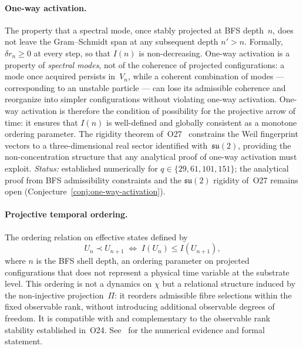   \paragraph{One-way activation.}
    The property that a spectral mode, once stably projected at BFS depth~$n$,
    does not leave the Gram--Schmidt span at any subsequent depth $n' > n$.
    Formally, $\delta r_n \geq 0$ at every step, so that $I(n)$ is non-decreasing.
    One-way activation is a property of \emph{spectral modes}, not of the
    coherence of projected configurations: a mode once acquired persists in~$V_n$,
    while a coherent combination of modes --- corresponding to an unstable particle
    --- can lose its admissible coherence and reorganize into simpler
    configurations without violating one-way activation.
    One-way activation is therefore the condition of possibility for the
    projective arrow of time: it ensures that $I(n)$ is well-defined and
    globally consistent as a monotone ordering parameter.
    The rigidity theorem of~O27~\cite{Beau2026a31} constrains the Weil fingerprint
    vectors to a three-dimensional real sector identified with~$\mathfrak{su}(2)$,
    providing the non-concentration structure that any analytical proof of
    one-way activation must exploit.
    \emph{Status:} established numerically for $q \in \{29,61,101,151\}$;
    the analytical proof from BFS admissibility constraints and the
    $\mathfrak{su}(2)$ rigidity of~O27 remains open
    (Conjecture~\ref{conj:one-way-activation}).

  \paragraph{Projective temporal ordering.}
    The ordering relation on effective states defined by
    \[
      U_n \prec U_{n+1} \;\Longleftrightarrow\; I(U_n) \leq I(U_{n+1}),
    \]
    where $n$ is the BFS shell depth, an ordering parameter on projected
    configurations that does not represent a physical time variable at the
    substrate level.
    This ordering is not a dynamics on $\chi$ but a relational structure induced
    by the non-injective projection~$\Pi$: it reorders admissible fibre selections
    within the fixed observable rank, without introducing additional observable
    degrees of freedom.
    It is compatible with and complementary to the observable rank stability
    established in~O24.
    See~\cite{Beau2026pto} for the numerical evidence and formal statement.

